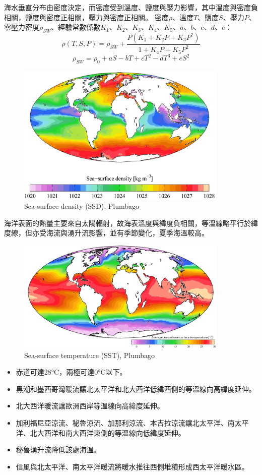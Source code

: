 \documentclass[a4paper,12pt]{report}
\begin{document}
海水垂直分布由密度決定，而密度受到溫度、鹽度與壓力影響，其中溫度與密度負相關，鹽度與密度正相關，壓力與密度正相關。
密度$\rho$、溫度$T$、鹽度$S$、壓力$P$、零壓力密度$\rho_{SW}$、經驗常數係數$K_1$、$K_2$、$K_3$、$K_4$、$K_5$、$a$、$b$、$c$、$d$、$e$：
\[\rho(T,S,P) = \rho_{SW} + \frac{P(K_1 + K_2P + K_3P^2)}{1 + K_4P + K_5P^2}\]
\[\rho_{SW} = \rho_0 + aS - bT + cT^2 - dT^3 + eS^2\]
\begin{figure}[H]
    \centering
    \includegraphics[width=0.9\textwidth]{SSD.png}
    \caption{Sea-surface density (SSD), Plumbago}
\end{figure}\FB
{}
海洋表面的熱量主要來自太陽輻射，故海表溫度與緯度負相關，等溫線略平行於緯度線，但亦受海流與湧升流影響，並有季節變化，夏季海溫較高。
\begin{figure}[H]
    \centering
    \includegraphics[width=0.9\textwidth]{SST.png}
    \caption{Sea-surface temperature (SST), Plumbago}
\end{figure}\FB
\begin{itemize}
\item 赤道可達28°C，兩極可達0°C以下。
\item 黑潮和墨西哥灣暖流讓北太平洋和北大西洋低緯西側的等溫線向高緯度延伸。
\item 北大西洋暖流讓歐洲西岸等溫線向高緯度延伸。
\item 加利福尼亞涼流、秘魯涼流、加那利涼流、本吉拉涼流讓北太平洋、南太平洋、北大西洋和南大西洋東側的等溫線向低緯度延伸。
\item 秘魯湧升流降低該處海溫。
\item 信風與北太平洋、南太平洋暖流將暖水推往西側堆積形成西太平洋暖水區。
\end{itemize}
\end{document}
